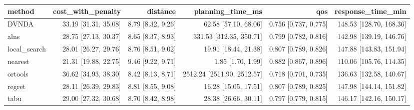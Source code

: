 \begin{tabular}{lrrrrr}
\toprule
method & cost\_with\_penalty & distance & planning\_time\_ms & qos & response\_time\_min \\
\midrule
DVNDA & 33.19 [31.31, 35.08] & 8.79 [8.32, 9.26] & 62.58 [57.10, 68.06] & 0.756 [0.737, 0.775] & 148.53 [128.70, 168.36] \\
alns & 28.75 [27.13, 30.37] & 8.65 [8.37, 8.93] & 331.53 [312.35, 350.71] & 0.799 [0.782, 0.816] & 142.98 [139.19, 146.76] \\
local\_search & 28.01 [26.27, 29.76] & 8.76 [8.51, 9.02] & 19.91 [18.44, 21.38] & 0.807 [0.789, 0.826] & 147.88 [143.83, 151.94] \\
nearest & 21.31 [19.88, 22.75] & 9.46 [9.22, 9.71] & 1.85 [1.70, 1.99] & 0.882 [0.867, 0.896] & 110.06 [105.76, 114.35] \\
ortools & 36.62 [34.93, 38.30] & 8.42 [8.13, 8.71] & 2512.24 [2511.90, 2512.57] & 0.718 [0.701, 0.735] & 136.63 [132.58, 140.67] \\
regret & 28.11 [26.39, 29.83] & 8.81 [8.55, 9.08] & 16.28 [15.05, 17.51] & 0.807 [0.789, 0.825] & 147.98 [144.14, 151.82] \\
tabu & 29.00 [27.32, 30.68] & 8.70 [8.42, 8.98] & 28.38 [26.66, 30.11] & 0.797 [0.779, 0.815] & 146.17 [142.16, 150.17] \\
\bottomrule
\end{tabular}
